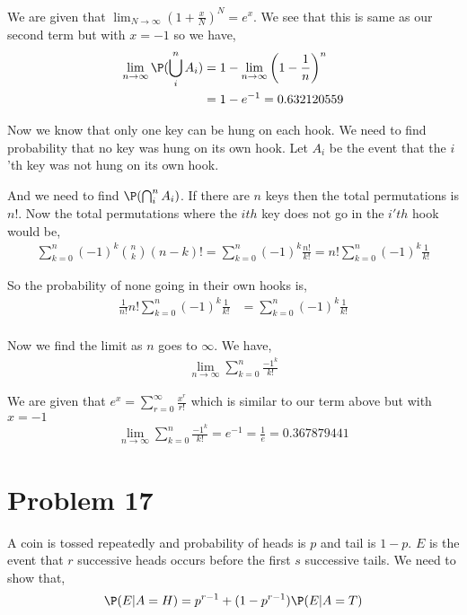 \documentclass[a4paper]{report}
\begin{document}
We are given that $\lim_{N \to \infty} (1 + \frac{x}{N})^{N} = e^{x}$. We see that this is same as our second term but with $x = -1$ so we have, 
\begin{align*}
    \lim_{n \to \infty} \P(\bigcup_i^{n} A_i) &= 1 -  \lim_{n \to \infty} \bigg (1 - \frac{1}{n} \bigg)^{n}\\
                                              &= 1 - e^{-1} = 0.632120559
\end{align*}

Now we know that only one key can be hung on each hook. We need to find probability that no key was hung on its own hook. Let  $A_i$ be the event that the $i$'th key was not hung on its own hook. 

And we need to find $\P(\bigcap_i^{n}A_i)$. If there are $n$ keys then the total permutations is $n!$. Now the total permutations where  the  $ith$ key does not go in the $i'th$ hook would be,  
\begin{align*}
\sum_{k=0}^{n} (-1)^{k} {n \choose k}(n - k)! = \sum_{k=0}^{n} (-1)^{k} \frac{n!}{k!} = n! \sum_{k=0}^{n} (-1)^{k}\frac{1}{k!}
\end{align*}


So the probability of none going in their own hooks is, 
\begin{align*}
    \frac{1}{n!}  n! \sum_{k=0}^{n} (-1)^{k}\frac{1}{k!} &=  \sum_{k=0}^{n} (-1)^{k}\frac{1}{k!} \\
\end{align*}


Now we find the limit as $n$ goes to $\infty$. We have,
\begin{align*}
    \lim_{n \to \infty}  \sum_{k=0}^{n} \frac{-1^{k}}{k!} 
\end{align*}

 We are given that $e^{x} = \sum_{r=0}^{\infty}\frac{x^{r}}{r!}$  which is similar to our term above but with $x = -1$
 $$  $$ 
\begin{align*}
    \lim_{n \to \infty}  \sum_{k=0}^{n} \frac{-1^{k}}{k!} = e^{-1} = \frac{1}{e} = 0.367879441
\end{align*}
\section*{Problem 17}

A coin is tossed repeatedly and probability of heads is $p$ and tail is $1 - p$. $E$ is the event that $r$ successive heads occurs before the first $s$ successive tails. We need to show that, 
$$ \P(E | A = H) = p^{r - 1} + (1 - p^{r - 1}) \P(E | A= T)$$  
\end{document}
